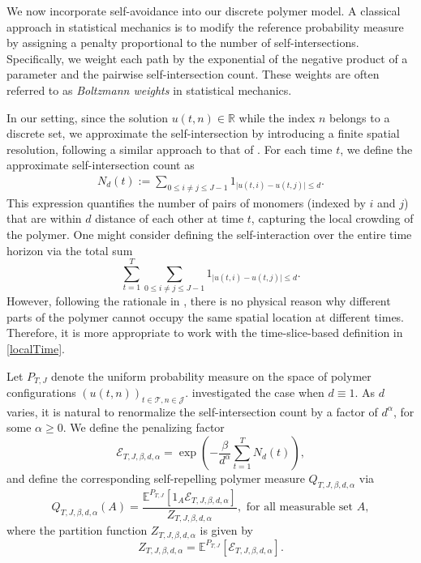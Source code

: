 \documentclass[12pt]{amsart}
\numberwithin{equation}{section}
\newcommand{\R}{\mathbb{R}}
\newcommand{\1}{\mathbf{1}}
\begin{document}
We now incorporate self-avoidance into our discrete polymer model. A classical approach in statistical mechanics is to modify the reference probability measure by assigning a penalty proportional to the number of self-intersections. Specifically, we weight each path by the exponential of the negative product of a parameter and the pairwise self-intersection count. These weights are often referred to as \textit{Boltzmann weights} in statistical mechanics.

In our setting, since the solution $u(t,n)\in\R$ while the index $n$ belongs to a discrete set, we approximate the self-intersection by introducing a finite spatial resolution, following a similar approach to that of \cite{lin2025radius}. For each time $t$, we define the approximate self-intersection count as
\begin{equation}
\label{localTime}
\begin{split}
    N_d(t):=\sum_{0\leq i\neq j\leq J-1}1_{\vert u(t,i)-u(t,j)\vert\leq d}.
    \end{split}
\end{equation}
This expression quantifies the number of pairs of monomers (indexed by $i$ and $j$) that are within $d$ distance of each other at time $t$, capturing the local crowding of the polymer. One might consider defining the self-interaction over the entire time horizon via the total sum
\begin{equation*}
    \sum\limits_{t=1}^{T}\sum_{0\leq i\neq j\leq J-1}1_{\vert u(t,i)-u(t,j)\vert\leq d}.
\end{equation*}
However, following the rationale in \cite{mueller2022scaling}, there is no physical reason why different parts of the polymer cannot occupy the same spatial location at different times. Therefore, it is more appropriate to work with the time-slice-based definition in \eqref{localTime}.

Let $P_{T,J}$ denote the uniform probability measure on the space of polymer configurations $(u(t,n))_{t\in\mathcal{T},n\in\mathcal{J}}$. \cite{lin2025radius} investigated the case when $d\equiv 1$. As $d$ varies, it is natural to renormalize the self-intersection count by a factor of $d^\alpha$, for some $\alpha\geq 0$. We define the penalizing factor
\begin{equation}
\label{penalF}
    \mathcal{E}_{T,J,\beta,d,\alpha}=\exp\left(-\frac{\beta}{d^\alpha}\sum_{t=1}^{T}N_d(t)\right),
\end{equation}
and define the corresponding self-repelling polymer measure $Q_{T,J,\beta,d,\alpha}$ via
\begin{equation}
\label{Qmeas}
Q_{T,J,\beta,d,\alpha}(A) =\frac{ \mathbb{E}^{P_{T,J}}[1_{A}\mathcal{E}_{T,J,\beta,d,\alpha}]}{Z_{T,J,\beta,d,\alpha}}, \text{ for all measurable set $A$},
\end{equation}
where the partition function $Z_{T,J,\beta,d,\alpha}$ is given by
\begin{equation}
\label{Z}
Z_{T,J,\beta,d,\alpha} = \mathbb{E}^{P_{T,J}}[\mathcal{E}_{T,J,\beta,d,\alpha}].
\end{equation}
\end{document}
